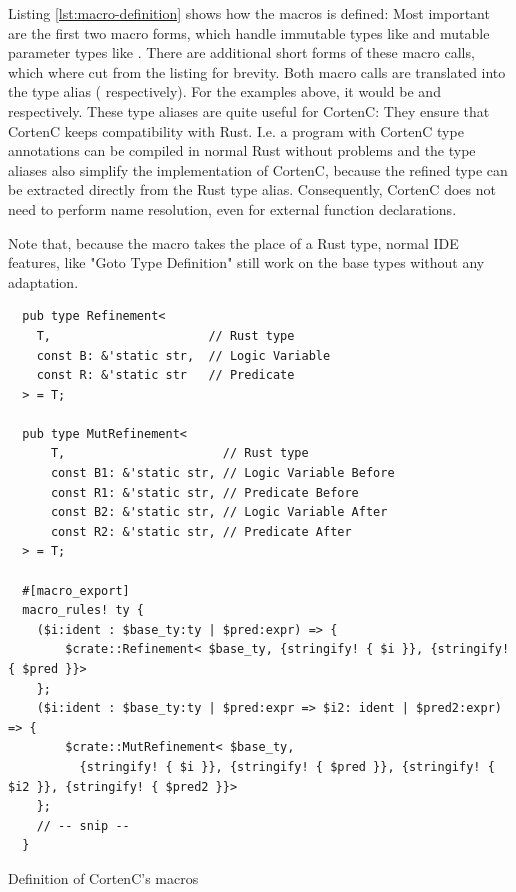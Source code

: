 \documentclass[twoside, english]{sdqthesis}
\theoremstyle{definition}
\begin{document}
Listing \ref{lst:macro-definition} shows how the  macros is defined: Most important are the first two macro forms, which handle immutable types like  and mutable parameter types like . 
There are additional short forms of these macro calls, which where cut from the listing for brevity. Both macro calls are translated into the type alias  ( respectively). For the examples above, it would be  and  respectively. These type aliases are quite useful for CortenC: They ensure that CortenC keeps compatibility with Rust. I.e. a program with CortenC type annotations can be compiled in normal Rust without problems and the type aliases also simplify the implementation of CortenC, because the refined type can be extracted directly from the Rust type alias. Consequently, CortenC does not need to perform name resolution, even for external function declarations.

Note that, because the  macro takes the place of a Rust type, normal IDE features, like "Goto Type Definition" still work on the base types without any adaptation.

\begin{listing}[h]
  \begin{verbatim}
  pub type Refinement<
    T,                      // Rust type
    const B: &'static str,  // Logic Variable
    const R: &'static str   // Predicate
  > = T;

  pub type MutRefinement<
      T,                      // Rust type
      const B1: &'static str, // Logic Variable Before
      const R1: &'static str, // Predicate Before
      const B2: &'static str, // Logic Variable After
      const R2: &'static str, // Predicate After
  > = T;

  #[macro_export]
  macro_rules! ty {
    ($i:ident : $base_ty:ty | $pred:expr) => {
        $crate::Refinement< $base_ty, {stringify! { $i }}, {stringify! { $pred }}>
    };
    ($i:ident : $base_ty:ty | $pred:expr => $i2: ident | $pred2:expr) => {
        $crate::MutRefinement< $base_ty, 
          {stringify! { $i }}, {stringify! { $pred }}, {stringify! { $i2 }}, {stringify! { $pred2 }}>
    };
    // -- snip --
  }
  \end{verbatim}
  \caption{Definition of CortenC's macros}
  \label{lst:macro-definition}
\end{listing}
\end{document}
